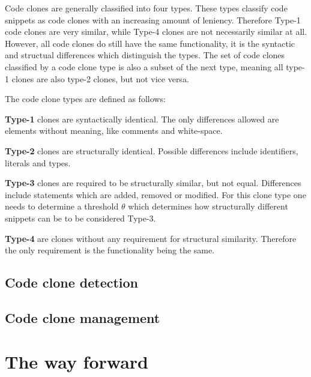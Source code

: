 \documentclass[12pt]{article}
\begin{document}
Code clones are generally classified into four types.\cite{Inoue_introduction_to_cc} These
types classify code snippets as code clones with an increasing amount of leniency.
Therefore Type-1 code clones are very similar, while Type-4 clones are not necessarily
similar at all. However, all code clones do still have the same functionality, it is the
syntactic and structual differences which distinguish the types. The set of code clones
classified by a code clone type is also a subset of the next type, meaning all type-1
clones are also type-2 clones, but not vice versa.

The code clone types are defined as follows:

\textbf{Type-1} clones are syntactically identical. The only differences allowed are elements
without meaning, like comments and white-space. 

\textbf{Type-2} clones are structurally identical. Possible differences include
identifiers, literals and types. 

\textbf{Type-3} clones are required to be structurally similar, but not equal. Differences
include statements which are added, removed or modified. For this clone type one needs to
determine a threshold $\theta$ which determines how structurally different snippets can be
to be considered Type-3\cite{Inoue_introduction_to_cc}.

\textbf{Type-4} are clones without any requirement for structural similarity. Therefore
the only requirement is the functionality being the same.

\subsection{Code clone detection}

\subsection{Code clone management}

\section{The way forward}



\end{document}
